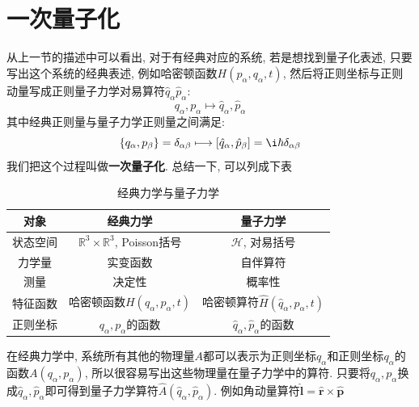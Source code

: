 \documentclass[a4paper,11pt]{book}
\begin{document}
\section{一次量子化}
从上一节的描述中可以看出, 对于有经典对应的系统, 若是想找到量子化表述, 只要写出这个系统的经典表述, 例如哈密顿函数$H(p_\alpha,q_\alpha,t)$, 然后将正则坐标与正则动量写成正则量子力学对易算符$\hat{q}_\alpha\hat{p}_\alpha$:
\begin{equation*}
  q_\alpha,p_\alpha\longmapsto\hat{q}_\alpha,\hat{p}_\alpha
\end{equation*}
其中经典正则量与量子力学正则量之间满足:
\begin{equation*}
  \{q_\alpha,p_\beta\}=\delta_{\alpha\beta}\longmapsto[\hat{q}_\alpha,\hat{p}_\beta]=\i\hbar\delta_{\alpha\beta}
\end{equation*}
我们把这个过程叫做\textbf{一次量子化}. 总结一下, 可以列成下表
\begin{table}[h]
\centering
\begin{tabular}{ccc}
对象 & 经典力学 & 量子力学 \\\hline\hline
状态空间 & $\mathbb{R}^3\times\mathbb{R}^3$, Poisson括号 & $\mathcal{H}$, 对易括号 \\\hline
力学量 & 实变函数 & 自伴算符\\\hline
测量 & 决定性 & 概率性\\\hline
特征函数 & 哈密顿函数$H(q_\alpha,p_\alpha,t)$ & 哈密顿算符$\hat{H}(\hat{q}_\alpha,\hat{p}_\alpha,t)$\\\hline
正则坐标 & $q_\alpha,p_\alpha$的函数 & $\hat{q}_\alpha,\hat{p}_\alpha$的函数\\\hline
\end{tabular}
\caption{经典力学与量子力学}\label{tab:tab2}
\end{table}
在经典力学中, 系统所有其他的物理量$A$都可以表示为正则坐标$q_\alpha$和正则坐标$q_\alpha$的函数$A(q_\alpha,p_\alpha)$, 所以很容易写出这些物理量在量子力学中的算符. 只要将$q_\alpha,p_\alpha$换成$\hat{q}_\alpha,\hat{p}_\alpha$即可得到量子力学算符$\hat{A}(\hat{q}_\alpha,\hat{p}_\alpha)$. 例如角动量算符$\hat{\mathbf{l}}=\hat{\mathbf{r}}\times\hat{\mathbf{p}}$
\end{document}
